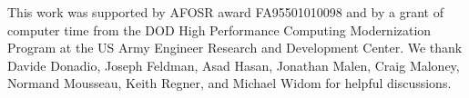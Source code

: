 \documentclass[aps,prb,twocolumn,superscriptaddress,footinbib,amsmath,amssymb,floatfix]{revtex4}
\begin{document}
\begin{acknowledgments}
This work was supported by AFOSR award FA95501010098 and by a grant 
of computer time from the DOD 
High Performance Computing Modernization Program at the US Army 
Engineer 
Research and Development Center. 
We thank Davide Donadio, Joseph Feldman, Asad Hasan, Jonathan Malen,  
Craig Maloney, Normand Mousseau, Keith Regner, and Michael Widom 
for helpful discussions.
\end{acknowledgments}



\end{document}
